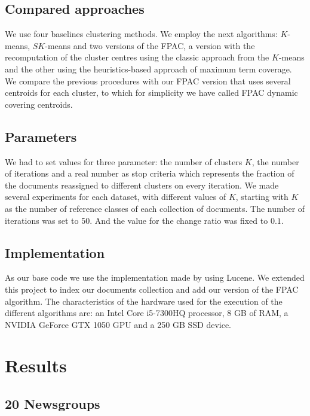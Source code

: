 \documentclass[runningheads]{llncs}
\begin{document}
\subsection{Compared approaches}

We use four baselines clustering methods. We employ the next algorithms: 
$K$-means, $SK$-means and two versions of the FPAC, a version with
the recomputation of the cluster centres using the classic approach 
from the $K$-means and the other using the heuristics-based approach of
maximum term coverage. We compare the previous procedures with our 
FPAC version that uses several centroids for each cluster, to which for
simplicity we have called FPAC dynamic covering centroids.

\subsection{Parameters}

We had to set values for three parameter: the number of clusters $K$,
the number of iterations and a real number as stop criteria which represents the fraction of the documents reassigned to different clusters on every iteration.
We made several experiments for 
each dataset, with different values of $K$, starting with $K$ as the number of reference classes of each collection of documents. The number of iterations was set to 50. And the value for the 
change ratio was fixed to $0.1$.

\subsection{Implementation}

As our base code we use the implementation made by \cite{ganguly_2018} using Lucene.
We extended this project to index our documents collection
and add our version of the FPAC algorithm.
The characteristics of the hardware used for the
execution of the different algorithms are:
an Intel Core i5-7300HQ processor,
8 GB of RAM, a NVIDIA GeForce GTX 1050 GPU
and a 250 GB SSD device.



\section{Results}

\subsection{20 Newsgroups}
\end{document}
